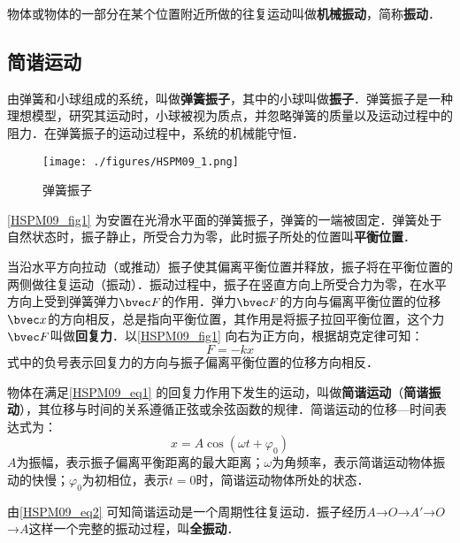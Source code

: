 
\begin{issues}
\issueDraft
\issueTODO
\end{issues}

物体或物体的一部分在某个位置附近所做的往复运动叫做\textbf{机械振动}，简称\textbf{振动}．

\subsection{简谐运动}

由弹簧和小球组成的系统，叫做\textbf{弹簧振子}，其中的小球叫做\textbf{振子}．弹簧振子是一种理想模型，研究其运动时，小球被视为质点，并忽略弹簧的质量以及运动过程中的阻力．在弹簧振子的运动过程中，系统的机械能守恒．

\begin{figure}[ht]
\centering
\texttt{[image: ./figures/HSPM09\_1.png]}
\caption{弹簧振子} \label{HSPM09_fig1}
\end{figure}

\autoref{HSPM09_fig1} 为安置在光滑水平面的弹簧振子，弹簧的一端被固定．弹簧处于自然状态时，振子静止，所受合力为零，此时振子所处的位置叫\textbf{平衡位置}．

当沿水平方向拉动（或推动）振子使其偏离平衡位置并释放，振子将在平衡位置的两侧做往复运动（振动）．振动过程中，振子在竖直方向上所受合力为零，在水平方向上受到弹簧弹力$\bvec F$的作用．弹力$\bvec F$的方向与偏离平衡位置的位移$\bvec x$的方向相反，总是指向平衡位置，其作用是将振子拉回平衡位置，这个力$\bvec F$叫做\textbf{回复力}．以\autoref{HSPM09_fig1} 向右为正方向，根据胡克定律可知：
\begin{equation}\label{HSPM09_eq1}
F=-kx
\end{equation}
式中的负号表示回复力的方向与振子偏离平衡位置的位移方向相反．

物体在满足\autoref{HSPM09_eq1} 的回复力作用下发生的运动，叫做\textbf{简谐运动}（\textbf{简谐振动}），其位移与时间的关系遵循正弦或余弦函数的规律．简谐运动的位移—时间表达式为：
\begin{equation}\label{HSPM09_eq2}
x=A\cos(\omega t + \varphi_0)
\end{equation}
$A$为振幅，表示振子偏离平衡距离的最大距离；$\omega$为角频率，表示简谐运动物体振动的快慢；$\varphi_0$为初相位，表示$t=0$时，简谐运动物体所处的状态．

由\autoref{HSPM09_eq2} 可知简谐运动是一个周期性往复运动．振子经历$A$→$O$→$A'$→$O$→$A$这样一个完整的振动过程，叫\textbf{全振动}．

